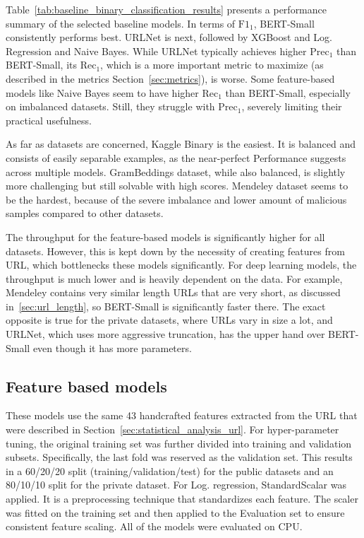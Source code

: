 Table~\ref {tab:baseline_binary_classification_results} presents a performance summary of the selected baseline models. In terms of $\mathrm{F}1_1$, BERT-Small consistently performs best. URLNet is next, followed by XGBoost and Log. Regression and Naive Bayes. While URLNet typically achieves higher $\mathrm{Prec}_1$ than BERT-Small, its $\mathrm{Rec}_1$, which is a more important metric to maximize (as described in the metrics Section~\ref{sec:metrics}), is worse. Some feature-based models like Naive Bayes seem to have higher $\mathrm{Rec}_1$ than BERT-Small, especially on imbalanced datasets. Still, they struggle with $\mathrm{Prec}_1$, severely limiting their practical usefulness.

As far as datasets are concerned, Kaggle Binary is the easiest. It is balanced and consists of easily separable examples, as the near-perfect Performance suggests across multiple models. GramBeddings dataset, while also balanced, is slightly more challenging but still solvable with high scores. Mendeley dataset seems to be the hardest, because of the severe imbalance and lower amount of malicious samples compared to other datasets.

The throughput for the feature-based models is significantly higher for all datasets. However, this is kept down by the necessity of creating features from URL, which bottlenecks these models significantly. For deep learning models, the throughput is much lower and is heavily dependent on the data. For example, Mendeley contains very similar length URLs that are very short, as discussed in~\ref{sec:url_length}, so BERT-Small is significantly faster there. The exact opposite is true for the private datasets, where URLs vary in size a lot, and URLNet, which uses more aggressive truncation, has the upper hand over BERT-Small even though it has more parameters.

\subsection{Feature based models}
\label{sec:feature_models}

These models use the same 43 handcrafted features extracted from the URL that were described in Section~\ref{sec:statistical_analysis_url}. For hyper-parameter tuning, the original training set was further divided into training and validation subsets. Specifically, the last fold was reserved as the validation set. This results in a 60/20/20 split (training/validation/test) for the public datasets and an 80/10/10 split for the private dataset. For Log. regression, StandardScalar was applied. It is a preprocessing technique that standardizes each feature. The scaler was fitted on the training set and then applied to the Evaluation set to ensure consistent feature scaling. All of the models were evaluated on CPU.

